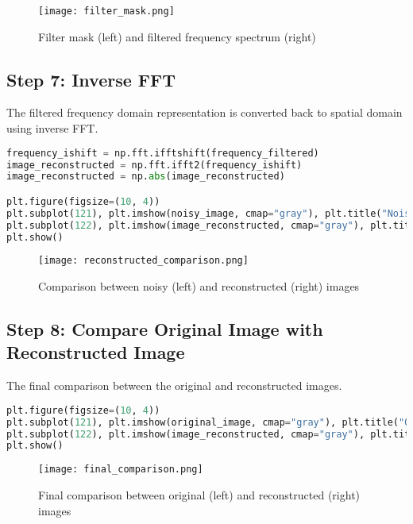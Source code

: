 \documentclass[12pt]{article}
\begin{document}
\begin{figure}[h]
    \centering
    \texttt{[image: filter\_mask.png]}
    \caption{Filter mask (left) and filtered frequency spectrum (right)}
\end{figure}

\subsection{Step 7: Inverse FFT}
The filtered frequency domain representation is converted back to spatial domain using inverse FFT.

\begin{lstlisting}[language=Python]
frequency_ishift = np.fft.ifftshift(frequency_filtered)
image_reconstructed = np.fft.ifft2(frequency_ishift)
image_reconstructed = np.abs(image_reconstructed)

plt.figure(figsize=(10, 4))
plt.subplot(121), plt.imshow(noisy_image, cmap="gray"), plt.title("Noisy Image"), plt.axis('off')
plt.subplot(122), plt.imshow(image_reconstructed, cmap="gray"), plt.title("Reconstructed Image"), plt.axis('off')
plt.show()
\end{lstlisting}

\begin{figure}[h]
    \centering
    \texttt{[image: reconstructed\_comparison.png]}
    \caption{Comparison between noisy (left) and reconstructed (right) images}
\end{figure}

\subsection{Step 8: Compare Original Image with Reconstructed Image}
The final comparison between the original and reconstructed images.

\begin{lstlisting}[language=Python]
plt.figure(figsize=(10, 4))
plt.subplot(121), plt.imshow(original_image, cmap="gray"), plt.title("Original Image"), plt.axis('off')
plt.subplot(122), plt.imshow(image_reconstructed, cmap="gray"), plt.title("Reconstructed Image"), plt.axis('off')
plt.show()
\end{lstlisting}

\begin{figure}[h]
    \centering
    \texttt{[image: final\_comparison.png]}
    \caption{Final comparison between original (left) and reconstructed (right) images}
\end{figure}
\end{document}
